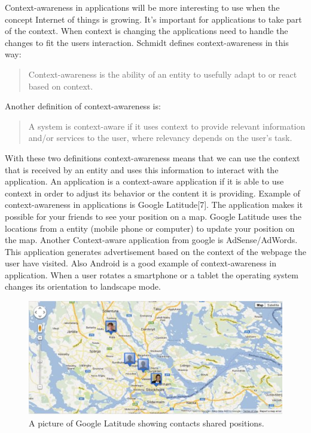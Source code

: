 Context-awareness in applications will be more interesting to use when the concept Internet of things is growing. It's important for applications to take part of the context. When context is changing the applications need to handle the changes to fit the users interaction. Schmidt defines context-awareness in this way:

\begin{quotation}
Context-awareness is the ability of an entity to usefully adapt to or react based on context. \cite{dey2001understanding}
\end{quotation}

Another definition of context-awareness is:

\begin{quotation}
A system is context-aware if it uses context to provide relevant information and\slash or services to the user, where relevancy depends on the user's task. \cite{abowd1999towards}
\end{quotation}

With these two definitions context-awareness means that we can use the context that is received by an entity and uses this information to interact with the application. An application is a context-aware application if it is able to use context in order to adjust its behavior or the content it is providing. Example of context-awareness in applications is Google Latitude[7]. The application makes it possible for your friends to see your position on a map. Google Latitude uses the locations from a entity (mobile phone or computer) to update your position on the map. Another Context-aware application from google is AdSense/AdWords. This application generates advertisement based on the context of the webpage the user have visited. 
Also Android is a good example of context-awareness in application. When a user rotates a smartphone or a tablet the operating system changes its orientation to landscape mode.

\begin{figure}[t]
	\centering
    	\includegraphics[scale=0.75]{part_2/context_awareness/latitude_pic.jpg}
		\caption{A picture of Google Latitude showing contacts shared positions.} 
\end{figure}

